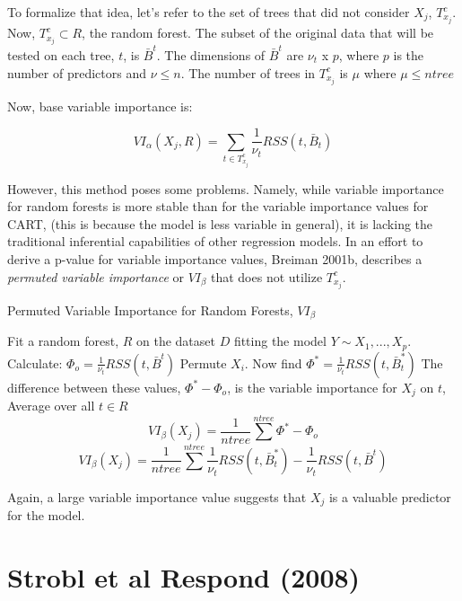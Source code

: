 \documentclass[12pt,twoside]{reedthesis}
\begin{document}
  To formalize that idea, let's refer to the set of trees that did not
  consider \(X_j\), \(T_{x_j}^c\). Now, \(T_{x_j}^c \subset R\), the
  random forest. The subset of the original data that will be tested on
  each tree, \(t\), is \(\bar{B}^t\). The dimensions of \(\bar{B}^t\) are
  \(\nu_t\) x \(p\), where \(p\) is the number of predictors and
  \(\nu \leq n\). The number of trees in \(T_{x_j}^c\) is \(\mu\) where
  \(\mu \leq ntree\)
  
  Now, base variable importance is:
  
  \[VI_{\alpha}(X_j, R) =  \sum_{t \in T_{x_j}^c} \frac 1 {\nu_t} RSS(t,\bar{B}_t)\]
  
  However, this method poses some problems. Namely, while variable
  importance for random forests is more stable than for the variable
  importance values for CART, (this is because the model is less variable
  in general), it is lacking the traditional inferential capabilities of
  other regression models. In an effort to derive a p-value for variable
  importance values, Breiman 2001b, describes a \emph{permuted variable
  importance} or \(VI_{\beta}\) that does not utilize \(T_{x_j}^c\).
  
  \begin{algorithm}
  \caption{Permuted Variable Importance for Random Forests, $VI_{\beta}$}
  \label{breiman}
  \begin{algorithmic}
  \State Fit a random forest, $R$ on the dataset $D$ fitting the model $Y \sim X_1,...,X_p$.
  \State Calculate: $\Phi_o =  \frac 1 {\nu_t} RSS(t,\bar{B}^t)$
  \State Permute $X_i$. Now find $\Phi^* =  \frac 1 {\nu_t} RSS(t,\bar{B}_t^*)$
  \State The difference between these values, $\Phi^* - \Phi_o$,  is the variable importance for $X_j$ on $t$,  
  \EndFor
  \State Average over all $t \in R$ 
   $$VI_{\beta}(X_j) = \frac 1 {ntree} \sum^{ntree} \Phi^* - \Phi_o$$
   $$VI_{\beta}(X_j) = \frac 1 {ntree} \sum^{ntree} \frac 1 {\nu_t} RSS(t,\bar{B}_t^*) - \frac 1 {\nu_t} RSS(t,\bar{B}^t)$$
  \EndFor
  \end{algorithmic}
  \end{algorithm}
  
  Again, a large variable importance value suggests that \(X_j\) is a
  valuable predictor for the model.
  
  \section{Strobl et al Respond (2008)}\label{strobl-et-al-respond-2008}
  
\end{document}
